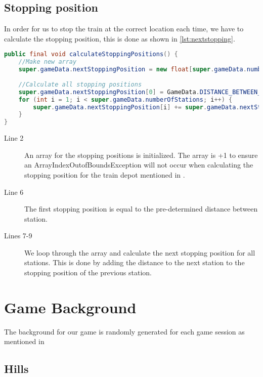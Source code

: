 \subsection{Stopping position}

In order for us to stop the train at the correct location each time, we have to calculate the stopping position, this is done as shown in \autoref{lst:nextstopping}.

\begin{lstlisting}[language=java,firstnumber=1,caption={Calculating the next stopping position.},label=lst:nextstopping]
public final void calculateStoppingPositions() {        
    //Make new array
    super.gameData.nextStoppingPosition = new float[super.gameData.numberOfStations + 1];
    
    //Calculate all stopping positions
    super.gameData.nextStoppingPosition[0] = GameData.DISTANCE_BETWEEN_STATIONS;
    for (int i = 1; i < super.gameData.numberOfStations; i++) {
        super.gameData.nextStoppingPosition[i] += super.gameData.nextStoppingPosition[i-1] + GameData.DISTANCE_BETWEEN_STATIONS;
    }
}
\end{lstlisting}

\begin{description}
\item[Line 2] An array for the stopping positions is initialized. The array is +1 to ensure an ArrayIndexOutofBoundsException will not occur when calculating the stopping position for the train depot mentioned in .
\item[Line 6] The first stopping position is equal to the pre-determined distance between station. 
\item[Lines 7-9] We loop through the array and calculate the next stopping position for all stations. This is done by adding the distance to the next station to the stopping position of the previous station.
\end{description}

\section{Game Background}

The background for our game is randomly generated for each game session as mentioned in 

\subsection{Hills}

